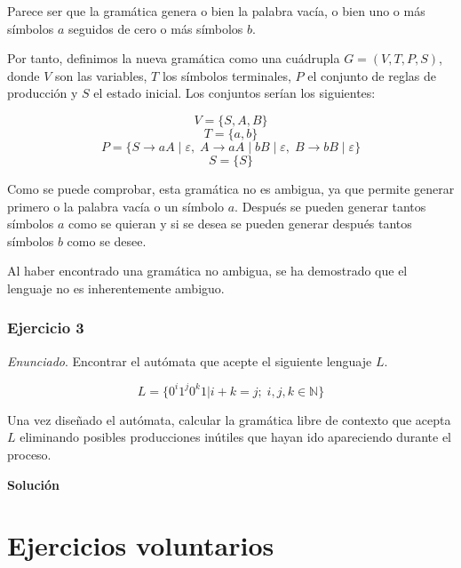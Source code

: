 \documentclass[11pt,a4paper]{article}
\newcommand{\enu}{\textit{Enunciado}}
\newcommand{\sol}{\textbf{Solución}}
\begin{document}
		Parece ser que la gramática genera o bien la palabra vacía, o bien uno o más símbolos $a$ seguidos de cero o más
		símbolos $b$. \par
		
		Por tanto, definimos la nueva gramática como una cuádrupla $G = (V, T, P, S)$, donde $V$ son las variables, $T$ los
		símbolos terminales, $P$ el conjunto de reglas de producción y $S$ el estado inicial. Los conjuntos serían los
		siguientes:
		
		\[V = \{S, A, B \}\]
		\[T = \{a, b\}\]
		\[P = \{S \rightarrow aA \; | \; \varepsilon, \; A \rightarrow aA \; | \; bB \; | \; \varepsilon, \;
				B \rightarrow bB \; | \; \varepsilon \}\]
		\[S = \{S\}\]
		
		Como se puede comprobar, esta gramática no es ambigua, ya que permite generar primero o la palabra vacía o un símbolo
		$a$. Después se pueden generar tantos símbolos $a$ como se quieran y si se desea se pueden generar después tantos
		símbolos $b$ como se desee. \par
		
		Al haber encontrado una gramática no ambigua, se ha demostrado que el lenguaje no es inherentemente ambiguo.
		
		\subsubsection{Ejercicio 3}
		\enu. Encontrar el autómata que acepte el siguiente lenguaje $L$.
		
		\[L = \lbrace 0^i 1^j 0^k 1 | i + k = j; \; i, j, k \in \mathbb{N} \rbrace\]
		
		Una vez diseñado el autómata, calcular la gramática libre de contexto que acepta $L$ eliminando posibles producciones
		inútiles que hayan ido apareciendo durante el proceso. \par
		
		\sol \par
		
	\newpage
	\section{Ejercicios voluntarios}
\end{document}
